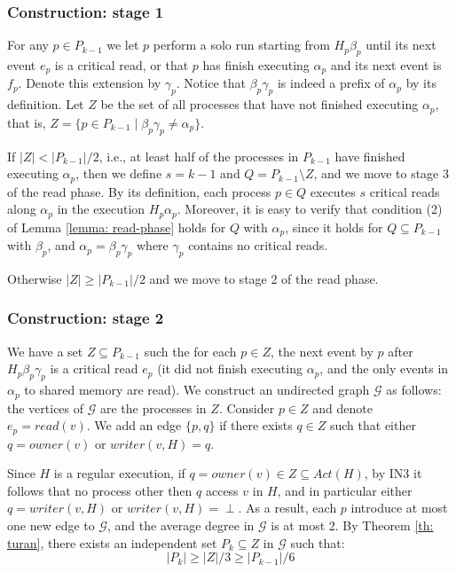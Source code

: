 \subsubsection{Construction: stage 1}
For any $p \in P_{k-1}$ we let $p$ perform a solo run starting from $H_p \beta_p$ until its next event $e_p$ is a critical read, or that $p$ has finish executing $\alpha_p$ and its next event is $f_p$. Denote this extension by $\gamma_p$. Notice that $\beta_p \gamma_p$ is indeed a prefix of $\alpha_p$ by its definition.
Let $Z$ be the set of all processes that have not finished executing $\alpha_p$, that is, $Z = \{p \in P_{k-1} \mid \beta_p \gamma_p \neq \alpha_p\}$.

If $|Z|<|P_{k-1}|/2$, i.e., at least half of the processes in $P_{k-1}$ have finished executing $\alpha_p$, then we define $s=k-1$ and $Q = P_{k-1} \setminus Z$, and we move to stage 3 of the read phase.
By its definition, each process $p \in Q$ executes $s$ critical reads along $\alpha_p$ in the execution $H_p \alpha_p$. Moreover, it is easy to verify that condition (2) of Lemma \ref{lemma: read-phase} holds for $Q$ with $\alpha_p$, since it holds for $Q \subseteq P_{k-1}$ with $\beta_p$, and $\alpha_p = \beta_p \gamma_p$ where $\gamma_p$ contains no critical reads.

Otherwise $|Z| \geq |P_{k-1}|/2$ and we move to stage 2 of the read phase.


\subsubsection{Construction: stage 2}

We have a set $Z \subseteq P_{k-1}$ such the for each $p \in Z$, the next event by $p$ after $H_p \beta_p \gamma_p$ is a critical read $e_p$ (it did not finish executing $\alpha_p$, and the only events in $\alpha_p$ to shared memory are read).
We construct an undirected graph $\mathcal{G}$ as follows: the vertices of $\mathcal{G}$ are the processes in $Z$. Consider $p \in Z$ and denote $e_p = read(v)$. We add an edge $\{p,q\}$ if there exists $q \in Z$ such that either $q = owner(v)$ or $writer(v, H) = q$.

Since $H$ is a regular execution, if $q = owner(v) \in Z \subseteq Act(H)$, by IN3 it follows that no process other then $q$ access $v$ in $H$, and in particular either $q = writer(v,H)$ or $writer(v,H) = \perp$.
As a result, each $p$ introduce at most one new edge to $\mathcal{G}$, and the average degree in $\mathcal{G}$ is at most 2. By Theorem \ref{th: turan}, there exists an independent set $P_k \subseteq Z$ in $\mathcal{G}$ such that:
$$|P_k| \geq |Z|/3 \geq |P_{k-1}|/6$$

